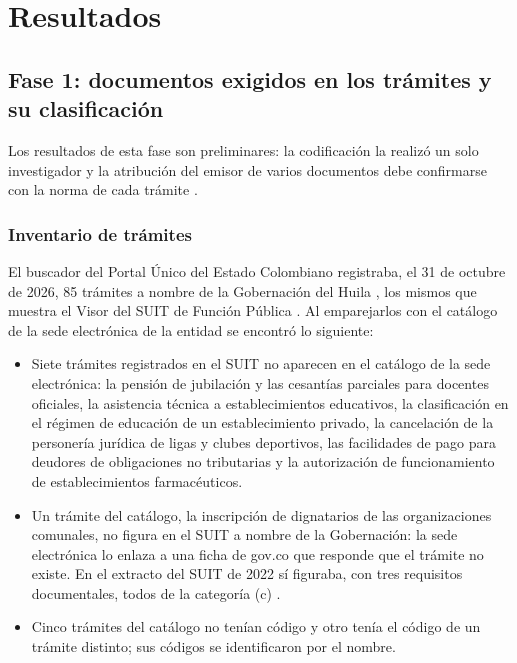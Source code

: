 \section{Resultados}

\subsection{Fase 1: documentos exigidos en los trámites y su clasificación}

Los resultados de esta fase son preliminares: la codificación la realizó un solo investigador y la atribución del emisor de varios documentos debe confirmarse con la norma de cada trámite .

\subsubsection{Inventario de trámites}

El buscador del Portal Único del Estado Colombiano registraba, el 31 de octubre de 2026, 85 trámites a nombre de la Gobernación del Huila \parencite{govco2026fichas}, los mismos que muestra el Visor del SUIT de Función Pública \parencite{funcionpublica2026visorsuit}. Al emparejarlos con el catálogo de la sede electrónica de la entidad \parencite{gobernaciondelhuila2026tramites} se encontró lo siguiente:

\begin{itemize}
\item Siete trámites registrados en el SUIT no aparecen en el catálogo de la sede electrónica: la pensión de jubilación y las cesantías parciales para docentes oficiales, la asistencia técnica a establecimientos educativos, la clasificación en el régimen de educación de un establecimiento privado, la cancelación de la personería jurídica de ligas y clubes deportivos, las facilidades de pago para deudores de obligaciones no tributarias y la autorización de funcionamiento de establecimientos farmacéuticos.
\item Un trámite del catálogo, la inscripción de dignatarios de las organizaciones comunales, no figura en el SUIT a nombre de la Gobernación: la sede electrónica lo enlaza a una ficha de gov.co que responde que el trámite no existe. En el extracto del SUIT de 2022 sí figuraba, con tres requisitos documentales, todos de la categoría (c) \parencite{funcionpublica2022suit}.
\item Cinco trámites del catálogo no tenían código y otro tenía el código de un trámite distinto; sus códigos se identificaron por el nombre.
\end{itemize}

